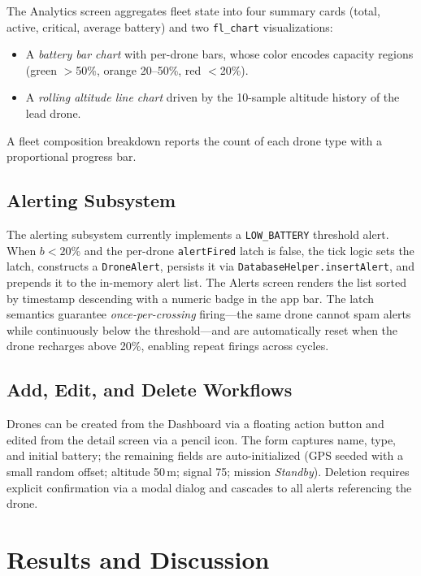 \documentclass[conference]{IEEEtran}
\begin{document}
The Analytics screen aggregates fleet state into four summary cards (total, active, critical, average battery) and two \texttt{fl\_chart} visualizations:

\begin{itemize}
    \item A \emph{battery bar chart} with per-drone bars, whose color encodes capacity regions (green $>$50\%, orange 20--50\%, red $<$20\%).
    \item A \emph{rolling altitude line chart} driven by the 10-sample altitude history of the lead drone.
\end{itemize}

A fleet composition breakdown reports the count of each drone type with a proportional progress bar.

\subsection{Alerting Subsystem}

The alerting subsystem currently implements a \texttt{LOW\_BATTERY} threshold alert. When $b < 20$\% and the per-drone \texttt{alertFired} latch is false, the tick logic sets the latch, constructs a \texttt{DroneAlert}, persists it via \texttt{DatabaseHelper.insertAlert}, and prepends it to the in-memory alert list. The Alerts screen renders the list sorted by timestamp descending with a numeric badge in the app bar. The latch semantics guarantee \emph{once-per-crossing} firing---the same drone cannot spam alerts while continuously below the threshold---and are automatically reset when the drone recharges above 20\%, enabling repeat firings across cycles.

\subsection{Add, Edit, and Delete Workflows}

Drones can be created from the Dashboard via a floating action button and edited from the detail screen via a pencil icon. The form captures name, type, and initial battery; the remaining fields are auto-initialized (GPS seeded with a small random offset; altitude 50\,m; signal 75; mission \emph{Standby}). Deletion requires explicit confirmation via a modal dialog and cascades to all alerts referencing the drone.

\section{Results and Discussion}
\label{sec:results}
\end{document}
